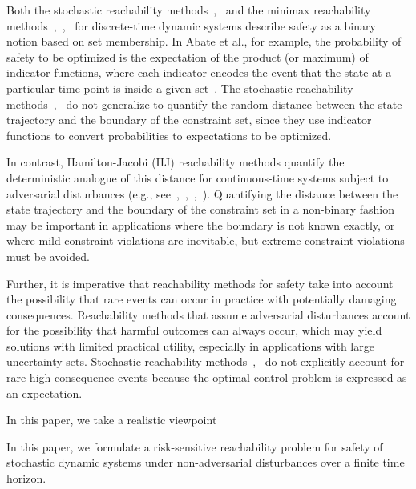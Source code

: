 \documentclass[letterpaper, 10 pt, conference]{ieeeconf}  %
\begin{document}
Both the stochastic reachability methods~\cite{abate2008probabilistic},~\cite{summers2010verification} and the minimax reachability methods~\cite{bertsekas1971control},~\cite{bertsekas1971minimax},~\cite{bertsekas2005dynamic} for discrete-time dynamic systems
describe safety as a binary notion based on set membership.
In Abate et al., for example, the probability of safety to be optimized is the expectation of the product (or maximum)
of indicator functions, where each indicator encodes the event that the state at a particular time point is inside a given set~\cite{abate2008probabilistic}.
The stochastic reachability methods~\cite{abate2008probabilistic},~\cite{summers2010verification} 
do not generalize to quantify the random distance between the state trajectory and the boundary of the constraint set,
since they use indicator functions to convert probabilities to expectations to be optimized.

In contrast, Hamilton-Jacobi (HJ) reachability methods quantify the deterministic analogue of this distance
for continuous-time systems subject to adversarial disturbances 
(e.g., see~\cite{bansal2017hamilton},~\cite{herbert2017fastrack},~\cite{EECS-2018-41},~\cite{mitchell2005toolbox}).
Quantifying the distance between the state trajectory and the boundary of the constraint set in a non-binary fashion
may be important in applications where the boundary is not known exactly,
or where mild constraint violations are inevitable, but extreme constraint violations must be avoided.

Further, it is imperative that reachability methods for safety take into account the possibility that rare events can occur in practice
with potentially damaging consequences. 
Reachability methods that assume adversarial disturbances account for the possibility that harmful outcomes can always occur,
which may yield solutions with limited practical utility, especially in applications with large uncertainty sets.
Stochastic reachability methods~\cite{abate2008probabilistic},~\cite{summers2010verification} do not explicitly account for rare high-consequence events
because the optimal control problem is expressed as an expectation. 

In this paper, we take a realistic viewpoint
  
 

In this paper, we formulate a risk-sensitive reachability problem for safety of stochastic dynamic systems under non-adversarial disturbances
over a finite time horizon. 
\end{document}
